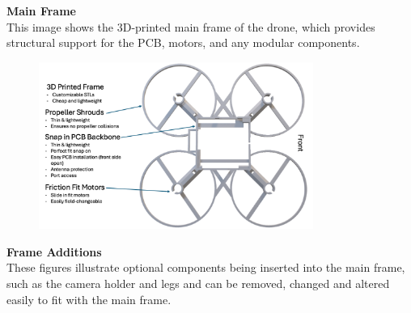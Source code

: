 \textbf{Main Frame} \\
This image shows the 3D-printed main frame of the drone, which provides structural support for the PCB, motors, and any modular components.

\begin{figure}[H]
    \centering
    \includegraphics[width=0.8\textwidth]{img/assembly-3.png}
\end{figure}

\pagebreak
\textbf{Frame Additions} \\
These figures illustrate optional components being inserted into the main frame, such as the camera holder and legs and can be removed, changed and altered easily to fit with the main frame.


